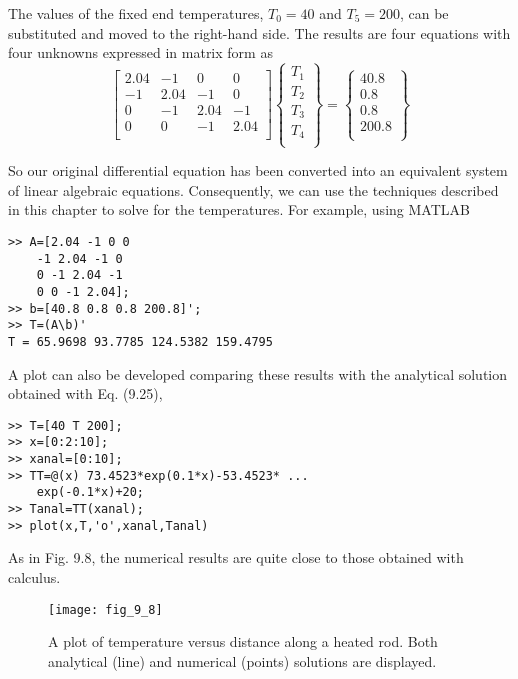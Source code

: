 \documentclass[../main.tex]{subfiles}
\begin{document}
The values of the fixed end temperatures, $T_{0}=40$ and $T_{5}=200$, can be substituted and moved to the right-hand side. The results are four equations with four unknowns expressed in matrix form as
\begin{equation}
\left [\begin{array}{ccccc}
2.04 	& -1 	& 0 	& 0	 	\\
-1 		& 2.04	& -1 	& 0 	\\
0 		& -1 	& 2.04	& -1 	\\
0 		& 0 	& -1 	& 2.04	\\
\end{array} \right ]
\begin{Bmatrix}
T_{1}\\
T_{2}\\
T_{3}\\
T_{4}\\
\end{Bmatrix} =
\begin{Bmatrix}
40.8\\
0.8\\
0.8\\
200.8\\
\end{Bmatrix}\tag{9.28}
\end{equation}

So our original differential equation has been converted into an equivalent system of linear algebraic equations. Consequently, we can use the techniques described in this chapter to solve for the temperatures. For example, using MATLAB
\begin{lstlisting}[numbers=none]
>> A=[2.04 -1 0 0
	-1 2.04 -1 0
	0 -1 2.04 -1
	0 0 -1 2.04];
>> b=[40.8 0.8 0.8 200.8]';
>> T=(A\b)'
T = 65.9698 93.7785 124.5382 159.4795
\end{lstlisting}
A plot can also be developed comparing these results with the analytical solution obtained with Eq. (9.25),
\begin{lstlisting}[numbers=none]
>> T=[40 T 200];
>> x=[0:2:10];
>> xanal=[0:10];
>> TT=@(x) 73.4523*exp(0.1*x)-53.4523* ...
	exp(-0.1*x)+20;
>> Tanal=TT(xanal);
>> plot(x,T,'o',xanal,Tanal)
\end{lstlisting}
As in Fig. 9.8, the numerical results are quite close to those obtained with calculus.

\begin{figure}[H]
	\centering
	\texttt{[image: fig\_9\_8]}
	\caption{\textsf{A plot of temperature versus distance along a heated rod. Both analytical (line) and numerical (points) solutions are displayed.}}
	\label{fig:fig_9_8}
\end{figure}
\end{document}
